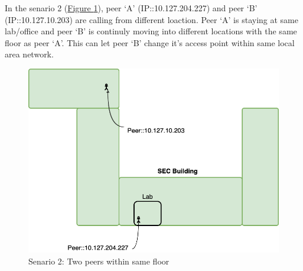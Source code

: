 	In the senario 2 (\hyperref[fig:scene-2]{Figure \ref{fig:scene-2}}), peer `A' (IP::10.127.204.227) and peer `B' (IP::10.127.10.203) are calling from different loaction. Peer `A' is staying at same lab/office and peer `B' is continuly moving into different locations with the same floor as peer `A'. This can let peer `B' change it's access point within same local area network. 
	\begin{figure}[thb]
		\begin{minipage}{\textwidth}
			\includegraphics[scale=0.29]{Images/experiment/senarios/in_floor.drawio.png}
		\end{minipage}
		\caption{Senario 2: Two peers within same floor}
		\label{fig:scene-2}
	\end{figure}

